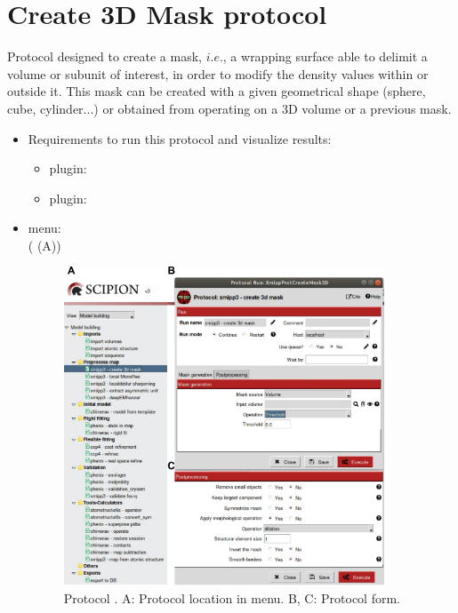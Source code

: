 \section{Create 3D Mask protocol}
\label{app:create3DMask}%

Protocol designed to create a mask, $i.e.$, a wrapping surface able to delimit a volume or subunit of interest, in order to modify the density values within or outside it. This mask can be created with a given geometrical shape (sphere, cube, cylinder...) or obtained from operating on a 3D volume or a previous mask.

\begin{itemize}
 \item Requirements to run this protocol and visualize results:
    \begin{itemize}
        \item \scipion plugin: 
        \item \scipion plugin: 
    \end{itemize}
 \item \scipion menu:\\
   ( (A))
  
 \begin{figure}[H]
     \centering 
     \captionsetup{width=.7\linewidth} 
     \includegraphics[width=0.90\textwidth]{Images_appendix/Fig206}
     \caption{Protocol . A: Protocol location in \scipion menu. B, C: Protocol form.}
     \label{fig:create3DMask_1}
    \end{figure}
  

\end{itemize}
